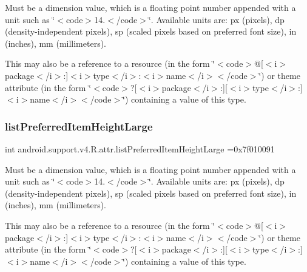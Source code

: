 Must be a dimension value, which is a floating point number appended with a unit such as \char`\"{}$<$code$>$14.\+5sp$<$/code$>$\char`\"{}. Available units are\+: px (pixels), dp (density-\/independent pixels), sp (scaled pixels based on preferred font size), in (inches), mm (millimeters). 

This may also be a reference to a resource (in the form \char`\"{}$<$code$>$@\mbox{[}$<$i$>$package$<$/i$>$\+:\mbox{]}$<$i$>$type$<$/i$>$\+:$<$i$>$name$<$/i$>$$<$/code$>$\char`\"{}) or theme attribute (in the form \char`\"{}$<$code$>$?\mbox{[}$<$i$>$package$<$/i$>$\+:\mbox{]}\mbox{[}$<$i$>$type$<$/i$>$\+:\mbox{]}$<$i$>$name$<$/i$>$$<$/code$>$\char`\"{}) containing a value of this type. \mbox{\label{classandroid_1_1support_1_1v4_1_1R_1_1attr_afdf6a597b54d03b67c21dc646bc1e2da}} 
\subsubsection{\texorpdfstring{list\+Preferred\+Item\+Height\+Large}{listPreferredItemHeightLarge}}
{\footnotesize\ttfamily int android.\+support.\+v4.\+R.\+attr.\+list\+Preferred\+Item\+Height\+Large =0x7f010091\hspace{0.3cm}{\ttfamily [static]}}

Must be a dimension value, which is a floating point number appended with a unit such as \char`\"{}$<$code$>$14.\+5sp$<$/code$>$\char`\"{}. Available units are\+: px (pixels), dp (density-\/independent pixels), sp (scaled pixels based on preferred font size), in (inches), mm (millimeters). 

This may also be a reference to a resource (in the form \char`\"{}$<$code$>$@\mbox{[}$<$i$>$package$<$/i$>$\+:\mbox{]}$<$i$>$type$<$/i$>$\+:$<$i$>$name$<$/i$>$$<$/code$>$\char`\"{}) or theme attribute (in the form \char`\"{}$<$code$>$?\mbox{[}$<$i$>$package$<$/i$>$\+:\mbox{]}\mbox{[}$<$i$>$type$<$/i$>$\+:\mbox{]}$<$i$>$name$<$/i$>$$<$/code$>$\char`\"{}) containing a value of this type. \mbox{\label{classandroid_1_1support_1_1v4_1_1R_1_1attr_a58ffbc1e4aa9d5fc75bba3f966c39df2}} 
